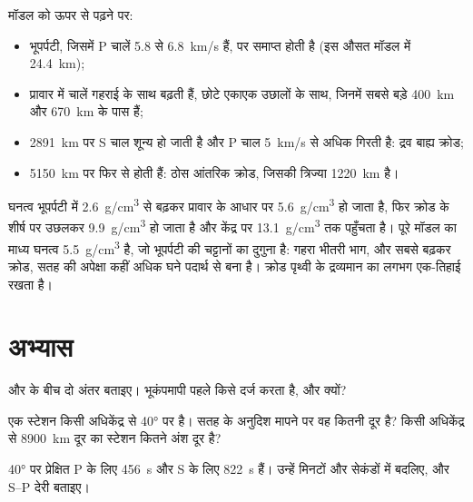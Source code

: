 मॉडल को ऊपर से पढ़ने पर:
\begin{itemize}
  \item भूपर्पटी, जिसमें P चालें 5.8 से \qty{6.8}{km/s} हैं,  पर समाप्त होती है
        (इस औसत मॉडल में \qty{24.4}{km});
  \item प्रावार में चालें गहराई के साथ बढ़ती हैं, छोटे एकाएक
        उछालों के साथ, जिनमें सबसे बड़े \qty{400}{km} और \qty{670}{km} के पास हैं;
  \item \qty{2891}{km} पर S चाल शून्य हो जाती है और P चाल
        \qty{5}{km/s} से अधिक गिरती है: द्रव बाह्य क्रोड;
  \item \qty{5150}{km} पर  फिर से होती हैं: ठोस आंतरिक क्रोड,
        जिसकी त्रिज्या \qty{1220}{km} है।
\end{itemize}

घनत्व भूपर्पटी में \qty{2.6}{g/cm^3} से बढ़कर प्रावार के आधार पर
\qty{5.6}{g/cm^3} हो जाता है, फिर क्रोड के शीर्ष पर उछलकर
\qty{9.9}{g/cm^3} हो जाता है और केंद्र पर \qty{13.1}{g/cm^3} तक
पहुँचता है। पूरे मॉडल का माध्य घनत्व \qty{5.5}{g/cm^3} है, जो
भूपर्पटी की चट्टानों का दुगुना है: गहरा भीतरी भाग, और सबसे बढ़कर क्रोड,
सतह की अपेक्षा कहीं अधिक घने पदार्थ से बना है। क्रोड पृथ्वी के द्रव्यमान का लगभग
एक-तिहाई रखता है।

\section{अभ्यास}

\begin{exercise}[$\star$]\label{exo:g11:seismic-structure:1}
 और  के बीच दो अंतर बताइए। भूकंपमापी पहले
किसे दर्ज करता है, और क्यों?
\end{exercise}

\begin{exercise}[$\star$]\label{exo:g11:seismic-structure:2}
एक स्टेशन किसी अधिकेंद्र से \ang{40} पर है। सतह के अनुदिश मापने पर वह
कितनी दूर है? किसी अधिकेंद्र से \qty{8900}{km} दूर का स्टेशन
कितने अंश दूर है?
\end{exercise}

\begin{exercise}[$\star$]\label{exo:g11:seismic-structure:3}
\ang{40} पर प्रेक्षित  P के लिए \qty{456}{s} और
S के लिए \qty{822}{s} हैं। उन्हें मिनटों और सेकंडों में बदलिए, और S--P
देरी बताइए।
\end{exercise}

